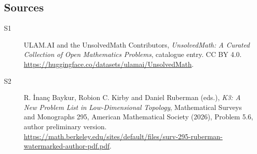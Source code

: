 \documentclass[11pt]{article}
\begin{document}
\subsection{Sources}
\begin{description}
\item[\hypertarget{source:statement:1}{S1}] ULAM.AI and the UnsolvedMath Contributors, \emph{UnsolvedMath: A Curated Collection of Open Mathematics Problems}, catalogue entry. CC BY 4.0. \url{https://huggingface.co/datasets/ulamai/UnsolvedMath}.
\item[\hypertarget{source:statement:2}{S2}] R. İnanç Baykur, Robion C. Kirby and Daniel Ruberman (eds.), \emph{K3: A New Problem List in Low-Dimensional Topology}, Mathematical Surveys and Monographs 295, American Mathematical Society (2026), Problem 5.6, author preliminary version. \url{https://math.berkeley.edu/sites/default/files/surv-295-ruberman-watermarked-author-pdf.pdf}.
\end{description}
\label{end:statement}
\end{document}
